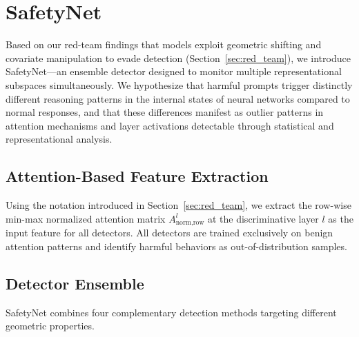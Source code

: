 


\section{SafetyNet} \label{sec:safetynet}

\begin{table}[t]
\centering

\caption{Cross-dataset evaluation on MAD and Anthropic benchmarks. On MAD, \textsc{SafetyNet} achieves 97--100\% detection accuracy with perfect AUROC. On Anthropic, all methods struggle due to minimal separation between normal and harmful activation distributions (see Section~\ref{sec:limitations}). Beatrix shows consistent behavior across obfuscation conditions as it uses spectral features not targeted by our obfuscation loss. CROW exhibits high model-dependent variance on Anthropic.}
\label{tab:main}
\end{table}

Based on our red-team findings that models exploit geometric shifting and covariate manipulation to evade detection (Section~\ref{sec:red_team}), we introduce SafetyNet---an ensemble detector designed to monitor multiple representational subspaces simultaneously. We hypothesize that harmful prompts trigger distinctly different reasoning patterns in the internal states of neural networks compared to normal responses, and that these differences manifest as outlier patterns in attention mechanisms and layer activations detectable through statistical and representational analysis.

\subsection{Attention-Based Feature Extraction} \label{sec:feature_extraction}

Using the notation introduced in Section~\ref{sec:red_team}, we extract the row-wise min-max normalized attention matrix $A_{\text{norm,row}}^l$ at the discriminative layer $l$ as the input feature for all detectors. All detectors are trained exclusively on benign attention patterns and identify harmful behaviors as out-of-distribution samples.

\subsection{Detector Ensemble} \label{sec:detectors}

SafetyNet combines four complementary detection methods targeting different geometric properties.

